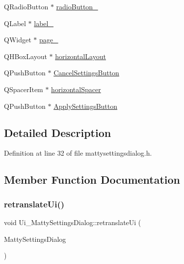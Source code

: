\begin{DoxyCompactItemize}
\item 
Q\+Radio\+Button $\ast$ \hyperlink{classUi__MattySettingsDialog_aa1af85cd639b28ae0557d1651203bff9}{radio\+Button\+\_}
\item 
Q\+Label $\ast$ \hyperlink{classUi__MattySettingsDialog_afdd480526f52a4eea64cd5b78796b31f}{label\+\_}
\item 
Q\+Widget $\ast$ \hyperlink{classUi__MattySettingsDialog_aba08ff4b8b0204e78668803d29a99daf}{page\+\_}
\item 
Q\+H\+Box\+Layout $\ast$ \hyperlink{classUi__MattySettingsDialog_ad0cd953caef9152c707b9ea9bffee662}{horizontal\+Layout}
\item 
Q\+Push\+Button $\ast$ \hyperlink{classUi__MattySettingsDialog_accbbae55ca7da2a96085f5c288e0de91}{Cancel\+Settings\+Button}
\item 
Q\+Spacer\+Item $\ast$ \hyperlink{classUi__MattySettingsDialog_ad5be2117ab753b5ed616b91faf0ed757}{horizontal\+Spacer}
\item 
Q\+Push\+Button $\ast$ \hyperlink{classUi__MattySettingsDialog_a6567baef3dec29ac994c8dc6da12ce0d}{Apply\+Settings\+Button}
\end{DoxyCompactItemize}


\subsection{Detailed Description}


Definition at line 32 of file mattysettingsdialog.\+h.



\subsection{Member Function Documentation}
\hypertarget{classUi__MattySettingsDialog_a63175c8e3ebbb59a8b60d126848a8825}{}\label{classUi__MattySettingsDialog_a63175c8e3ebbb59a8b60d126848a8825} 
\subsubsection{\texorpdfstring{retranslate\+Ui()}{retranslateUi()}}
{\footnotesize\ttfamily void Ui\+\_\+\+Matty\+Settings\+Dialog\+::retranslate\+Ui (\begin{DoxyParamCaption}\item[{Q\+Widget $\ast$}]{Matty\+Settings\+Dialog }\end{DoxyParamCaption})\hspace{0.3cm}{\ttfamily [inline]}}



